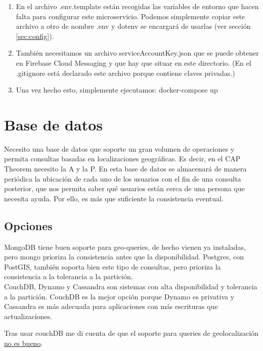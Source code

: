 \begin{enumerate}
	\item En el archivo .env.template están recogidas las variables de entorno que hacen falta para configurar este microservicio.
Podemos simplemente copiar este archivo a otro de nombre .env y dotenv se encargará de usarlas (ver sección \ref{sec:config}).
\item También necesitamos un archivo serviceAccountKey.json que se puede obtener en Firebase Cloud Messaging y que hay que situar en este directorio. 
(En el .gitignore está declarado este archivo porque contiene claves privadas.)
\item Una vez hecho esto, simplemente ejecutamos: docker-compose up
\end{enumerate}

\section{Base de datos}

Necesito una base de datos que soporte un gran volumen de operaciones y permita consultas basadas en localizaciones geográficas. Es decir, en el CAP Theorem necesito la A y la P.
En esta base de datos se almacenará de manera periódica la ubicación de cada uno de los usuarios con el fin de una consulta posterior, que nos permita saber qué usuarios
están cerca de una persona que necesita ayuda. Por ello, es más que suficiente la consistencia eventual.

\subsection{Opciones}

MongoDB tiene buen soporte para geo-queries, de hecho vienen ya instaladas, pero mongo prioriza la consistencia antes que la disponibilidad. Postgres, con PostGIS, también soporta bien
este tipo de consultas, pero prioriza la consistencia a la tolerancia a la partición. \\
CouchDB, Dynamo y Cassandra son sistemas con alta disponibilidad y tolerancia a la partición. CouchDB es la mejor opción porque Dynamo es privativa y Cassandra es más adecuada para aplicaciones con más
escrituras que actualizaciones. 

Tras usar couchDB me di cuenta de que el soporte para queries de geolocalización \href{https://docs.couchdb.org/en/stable/ddocs/search.html?highlight=geospatial#geographical-searches}{no es bueno}.


